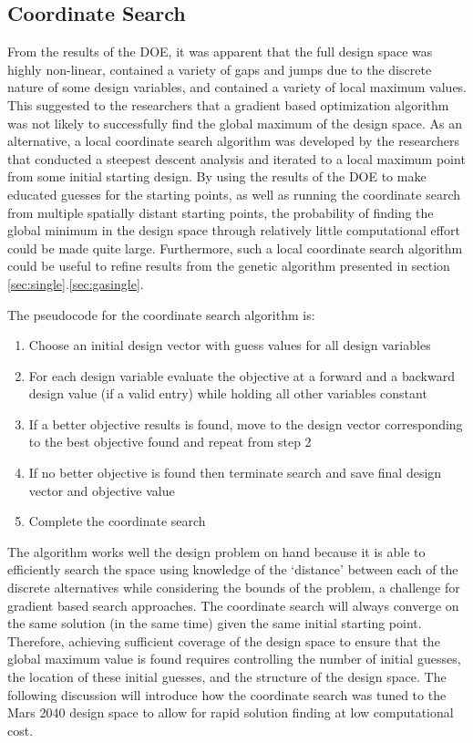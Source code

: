 \documentclass[]{aiaa-pretty}
\begin{document}
\subsection{Coordinate Search}
\label{sec:coordinate}
From the results of the DOE, it was apparent that the full design space was highly non-linear, contained a variety of gaps and jumps due to the discrete nature of some design variables, and contained a variety of local maximum values. This suggested to the researchers that a gradient based optimization algorithm was not likely to successfully find the global maximum of the design space. As an alternative, a local coordinate search algorithm was developed by the researchers that conducted a steepest descent analysis and iterated to a local maximum point from some initial starting design. By using the results of the DOE to make educated guesses for the starting points, as well as running the coordinate search from multiple spatially distant starting points, the probability of finding the global minimum in the design space through relatively little computational effort could be made quite large. Furthermore, such a local coordinate search algorithm could be useful to refine results from the genetic algorithm presented in section \ref{sec:single}.\ref{sec:gasingle}. 

The pseudocode for the coordinate search algorithm is:
\begin{enumerate}
  \item Choose an initial design vector with guess values for all design variables
  \item For each design variable evaluate the objective at a forward and a backward design value (if a valid entry) while holding all other variables constant
  \item If a better objective results is found, move to the design vector corresponding to the best objective found and repeat from step 2
  \item If no better objective is found then terminate search and save final design vector and objective value
  \item Complete the coordinate search
\end{enumerate}

The algorithm works well the design problem on hand because it is able to efficiently search the space using knowledge of the ‘distance’ between each of the discrete alternatives while considering the bounds of the problem, a challenge for gradient based search approaches. The coordinate search will always converge on the same solution (in the same time) given the same initial starting point. Therefore, achieving sufficient coverage of the design space to ensure that the global maximum value is found requires controlling the number of initial guesses, the location of these initial guesses, and the structure of the design space. The following discussion will introduce how the coordinate search was tuned to the Mars 2040 design space to allow for rapid solution finding at low computational cost. 
\end{document}
